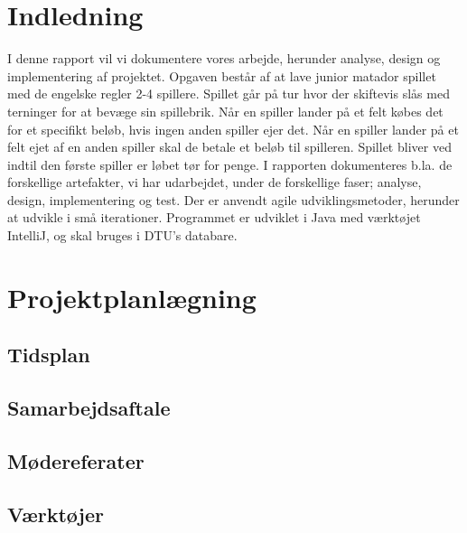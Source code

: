 
\section{Indledning}
I denne rapport vil vi dokumentere vores arbejde, herunder analyse, design og implementering af projektet. Opgaven består af at lave junior matador spillet med de engelske regler 2-4 spillere. Spillet går på tur hvor der skiftevis slås med terninger for at bevæge sin spillebrik. Når en spiller lander på et felt købes det for et specifikt beløb, hvis ingen anden spiller ejer det. Når en spiller lander på et felt ejet af en anden spiller skal de betale et beløb til spilleren. Spillet bliver ved indtil den første spiller er løbet tør for penge. I rapporten dokumenteres b.la. de forskellige artefakter, vi har udarbejdet, under de forskellige faser; analyse, design, implementering og test. Der er anvendt agile udviklingsmetoder, herunder at udvikle i små iterationer. Programmet er udviklet i Java med værktøjet IntelliJ, og skal bruges i DTU’s databare.

\section{Projektplanlægning}
\subsection*{Tidsplan}
\subsection*{Samarbejdsaftale}
\subsection*{Mødereferater}
\subsection*{Værktøjer}